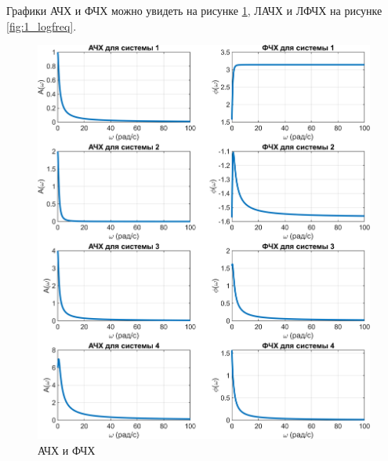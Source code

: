 Графики АЧХ и ФЧХ можно увидеть на рисунке \ref{fig:1_freq}, ЛАЧХ и ЛФЧХ
на рисунке \ref{fig:1_logfreq}.
\begin{figure}[H]
    \centering
    \includegraphics[width=\linewidth]{figs/combined_A_P_freq.png}
    \caption{АЧХ и ФЧХ}
    \label{fig:1_freq}
\end{figure}
